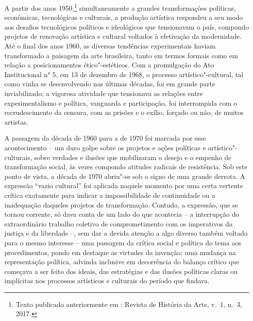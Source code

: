 A partir dos anos 1950,\footnote{Texto
  publicado anteriormente em \scalebox{0.8}{MODOS}: Revista de História da Arte, v.~1,
  n.~3, 2017.} simultaneamente a grandes transformações
políticas, econômicas, tecnológicas e culturais, a produção artística
respondeu a seu modo aos desafios tecnológicos políticos e ideológicos
que tensionavam o país, compondo projetos de renovação artística e
cultural voltados à efetivação da modernidade. Até o final dos anos
1960, as diversas tendências experimentais haviam transformado a
paisagem da arte brasileira, tanto em termos formais como em relação a
posicionamentos ético"-estéticos. Com a promulgação do Ato Institucional
n° 5, em 13 de dezembro de 1968, o processo artístico"-cultural, tal como
vinha se desenvolvendo nas últimas décadas, foi em grande parte
inviabilizado; a vigorosa atividade que tensionava as relações entre
experimentalismo e política, vanguarda e participação, foi interrompida
com o recrudescimento da censura, com as prisões e o exílio, forçado ou
não, de muitos artistas.

A passagem da década de 1960 para a de 1970 foi marcada por esse
acontecimento -- um duro golpe sobre os projetos e ações políticas e
artístico"-culturais, sobre verdades e ilusões que mobilizaram o desejo e
o empenho de transformação social, às vezes compondo atitudes radicais
de resistência. Sob este ponto de vista, a década de 1970 abriu"-se sob o
signo de uma grande derrota. A expressão ``vazio cultural'' foi aplicada
naquele momento por uma certa vertente crítica exatamente para indicar a
impossibilidade de continuidade ou a inadequação daqueles projetos de
transformação. Contudo, a expressão, que se tornou corrente, só dava
conta de um lado do que acontecia -- a interrupção do extraordinário
trabalho coletivo de comprometimento com os imperativos da justiça e da
liberdade --, sem dar a devida atenção a algo diverso também voltado
para o mesmo interesse -- uma passagem da crítica social e política do
tema aos procedimentos, pondo em destaque as virtudes da invenção; uma
mudança na representação política, advinda inclusive em decorrência do
balanço crítico que começava a ser feito dos ideais, das estratégias e
das ilusões políticas claras ou implícitas nos processos artísticos e
culturais do período que findava.

